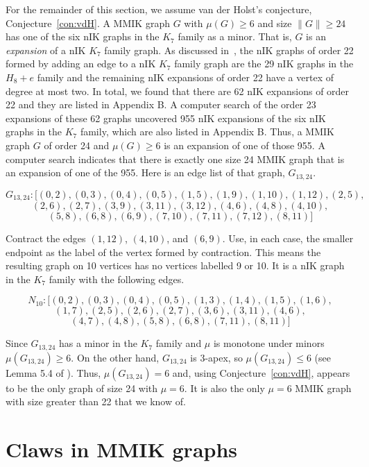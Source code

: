 \documentclass{amsart}
\theoremstyle{remark}
\begin{document}
{For the remainder of this section, we assume van der Holst's conjecture, Conjecture~\ref{con:vdH}. A MMIK graph $G$ with $\mu(G) \geq 6$ and size $\|G\| \geq 24$ has one of the six nIK graphs in the $K_7$ family as a minor. That is,  $G$ is an {\em expansion} of a nIK $K_7$ family graph.
As discussed in~\cite{KM}, the nIK graphs of order 22 formed by adding an edge to a nIK $K_7$ family graph are the 29 nIK graphs in the $H_8+e$ family and the remaining nIK expansions of order 22 have a vertex of degree at most two. In total, we found that there are 62 nIK expansions of order 22 and they 
are listed in Appendix B. A computer search of the order 23 expansions of these 62 graphs uncovered 955 nIK expansions of the six nIK graphs in the $K_7$ family,
which are also listed in Appendix B.
Thus, a MMIK graph $G$ of order 24 and $\mu(G) \geq 6$ is an expansion of one of those 955. 
A computer search indicates that there is exactly one 
size 24 MMIK graph that is an expansion of one of the 955. Here is an edge list of that graph, $G_{13,24}$.

$$G_{13,24} :
{[}(0, 2), (0, 3), (0, 4), (0, 5), (1, 5), (1, 9), (1, 10), (1, 12), (2, 5),$$
$$ (2, 6), (2, 7), (3, 9), (3, 11), (3, 12), (4, 6), (4, 8), (4, 10), $$
$$(5, 8), (6, 8), (6, 9), (7, 10), (7, 11), (7, 12), (8, 11)]$$

Contract the edges $(1,12)$, $(4,10)$, and $(6,9)$. Use, in each case, the smaller endpoint as the label of the vertex formed by contraction. 
This means the resulting graph on 10 vertices has no vertices labelled 9 or 10.
It is a nIK graph in the
$K_7$ family with the following edges. 

$$N_{10}: {[}(0, 2), (0, 3), (0, 4), (0, 5), (1, 3), (1, 4), (1, 5), (1, 6), $$
$$(1, 7), (2, 5), (2, 6), (2, 7), (3, 6), (3, 11), (4, 6),$$
$$ (4, 7), (4, 8), (5, 8), (6, 8), (7, 11), (8, 11){]}$$

Since $G_{13,24}$ has a minor in the $K_7$ family and $\mu$ is monotone under minors~\cite{CdV} $\mu(G_{13,24}) \geq 6$. On the other hand,
$G_{13,24}$ is $3$-apex, so $\mu(G_{13,24}) \leq 6$ (see Lemma 5.4 of \cite{MNPP}). Thus, $\mu(G_{13,24}) = 6$ and, using Conjecture~\ref{con:vdH},
appears to be the only graph of size 24 with $\mu = 6$. It is also the only $\mu = 6$ MMIK graph with size greater than 22 that we know of.

\section{Claws in MMIK graphs}
\label{sec:claws}

}
\end{document}
